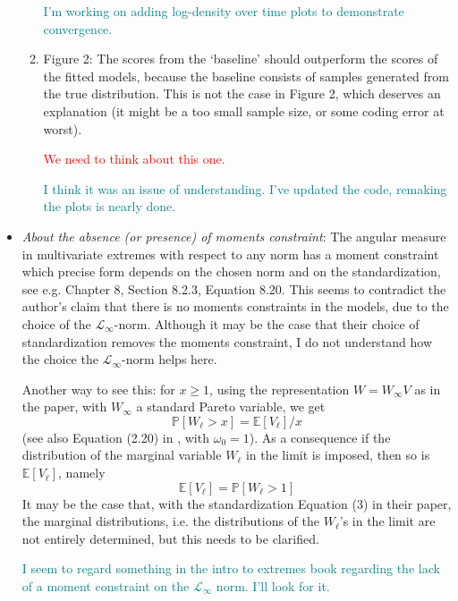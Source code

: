 \documentclass[10pt]{article}
\newcommand{\comment}[1]{\textcolor{teal}{#1}}
\newcommand{\bruno}[1]{\textcolor{red}{#1}}
\begin{document}
\begin{itemize}
\begin{enumerate}
            \comment{I'm working on adding log-density over time plots to demonstrate convergence.}
            
            \item Figure 2: The scores from the ‘baseline’ should outperform the scores of
            the fitted models, because the baseline consists of samples generated from the 
            true distribution. This is not the case in Figure 2, which deserves an explanation 
            (it might be a too small sample size, or some coding error at worst).

            \bruno{We need to think about this one.}

            \comment{I think it was an issue of understanding.  I've updated the code, remaking the plots
            is nearly done.}

        \end{enumerate}

    \item \emph{About the absence (or presence) of moments constraint}: The angular measure in
    multivariate extremes with respect to any norm has a moment constraint which precise form depends 
    on the chosen norm and on the standardization, see e.g. 
    \cite{beirlant2006} Chapter 8, Section 8.2.3, Equation 8.20. 
    This seems to contradict the author’s claim that there is no moments constraints in the models, 
    due to the choice of the $\mathcal{L}_{\infty}$-norm. Although it may be the case that their choice
    of standardization removes the moments constraint, I do not understand how the choice the 
    $\mathcal{L}_{\infty}$-norm helps here.

    Another way to see this: for $x \geq 1$, using the representation $W = W_{\infty}V$ as in the
    paper, with $W_{\infty}$ a standard Pareto variable, we get 
    \[\mathbb{P}\left[W_{\ell} > x\right] = \mathbb{E}\left[V_{\ell}\right] / x\]
    (see also Equation (2.20) in \cite{ferreira2014}, with $\omega_0 = 1$).  As a consequence if 
    the distribution of the marginal variable $W_{\ell}$ in the limit is imposed, then so is 
    $\mathbb{E}\left[V_{\ell}\right]$, namely 
    \[ \mathbb{E}\left[V_{\ell}\right] = \mathbb{P}\left[W_{\ell} > 1\right] \]
    It may be the case that, with the standardization Equation (3) in their paper, the marginal
    distributions, i.e. the distributions of the $W_{\ell}$’s in the limit are not entirely determined, 
    but this needs to be clarified.

    \comment{I seem to regard something in the intro to extremes book regarding the lack of a
    moment constraint on the $\mathcal{L}_{\infty}$ norm.  I'll look for it.}


\end{itemize}
\end{document}
